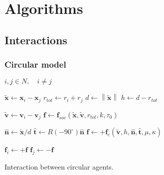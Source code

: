 \section{Algorithms}


\renewcommand{\algorithmiccomment}[1]{{\hspace{1.0 em}\color{gray}\textit{// #1}}}  %


\subsection{Interactions}
\subsubsection{Circular model}
\begin{algorithm}[H]
\begin{algorithmic}[1]  %
\REQUIRE $ i,j \in N, \quad i \neq j $
\ENSURE

\STATE $ \tilde{\mathbf{x}} \gets \mathbf{x}_{i} - \mathbf{x}_{j} $
\STATE $ r_{tot} \gets r_{i} + r_{j} $ 
\STATE $ d \gets \left\|\tilde{\mathbf{x}}\right\| $
\STATE $ h \gets d - r_{tot} $
\STATE

\STATE $ \tilde{\mathbf{v}} \gets \mathbf{v}_{i} - \mathbf{v}_{j} $
\STATE $ \mathbf{f} \gets \mathbf{f}_{soc}(\tilde{\mathbf{x}}, \tilde{\mathbf{v}}, r_{tot}, k, \tau_{0}) $

\STATE

\STATE $ \hat{\mathbf{n}} \gets \tilde{\mathbf{x}} / d $
\STATE $ \hat{\mathbf{t}} \gets R(-90^{\circ}) \hat{\mathbf{n}} $
\STATE $ \mathbf{f} \gets +\mathbf{f}_{c}(\tilde{\mathbf{v}}, h, \hat{\mathbf{n}}, \hat{\mathbf{t}}, \mu, \kappa) $
\ENDIF

\STATE
\STATE $ \mathbf{f}_{i} \gets +\mathbf{f} $
\STATE $ \mathbf{f}_{j} \gets -\mathbf{f} $
\ENDIF
\end{algorithmic}
\caption{Interaction between circular agents.}
\end{algorithm}


